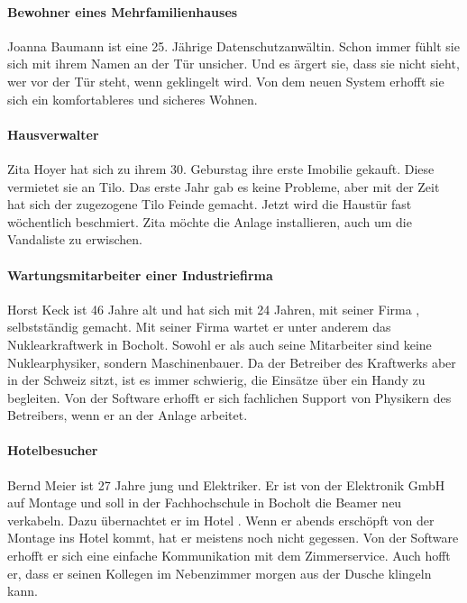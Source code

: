 \paragraph{Bewohner eines Mehrfamilienhauses}
    Joanna Baumann ist eine 25. Jährige Datenschutzanwältin.
    Schon immer fühlt sie sich mit ihrem Namen an der Tür unsicher.
    Und es ärgert sie, dass sie nicht sieht, wer vor der Tür steht, wenn geklingelt wird.
    Von dem neuen System erhofft sie sich ein komfortableres und sicheres Wohnen.


\paragraph{Hausverwalter}
    Zita Hoyer hat sich zu ihrem 30. Geburstag ihre erste Imobilie gekauft.
    Diese vermietet sie an Tilo.
    Das erste Jahr gab es keine Probleme, aber mit der Zeit hat sich der zugezogene Tilo Feinde gemacht.
    Jetzt wird die Haustür fast wöchentlich beschmiert.
    Zita möchte die Anlage installieren, auch um die Vandaliste zu erwischen.


\paragraph{Wartungsmitarbeiter einer Industriefirma}
    Horst Keck ist 46 Jahre alt und hat sich mit 24 Jahren, mit seiner Firma , selbstständig gemacht.
    Mit seiner Firma wartet er unter anderem das Nuklearkraftwerk  in Bocholt.
    Sowohl er als auch seine Mitarbeiter sind keine Nuklearphysiker, sondern Maschinenbauer.
    Da der Betreiber des Kraftwerks aber in der Schweiz sitzt, ist es immer schwierig, die Einsätze über ein Handy zu begleiten.
    Von der Software erhofft er sich fachlichen Support von Physikern des Betreibers, wenn er an der Anlage arbeitet.


\paragraph{Hotelbesucher}
    Bernd Meier ist 27 Jahre jung und Elektriker.
    Er ist von der Elektronik GmbH auf Montage und soll in der Fachhochschule in Bocholt die Beamer neu verkabeln.
    Dazu übernachtet er im Hotel .
    Wenn er abends erschöpft von der Montage ins Hotel kommt, hat er meistens noch nicht gegessen.
    Von der Software erhofft er sich eine einfache Kommunikation mit dem Zimmerservice.
    Auch hofft er, dass er seinen Kollegen im Nebenzimmer morgen aus der Dusche klingeln kann.

